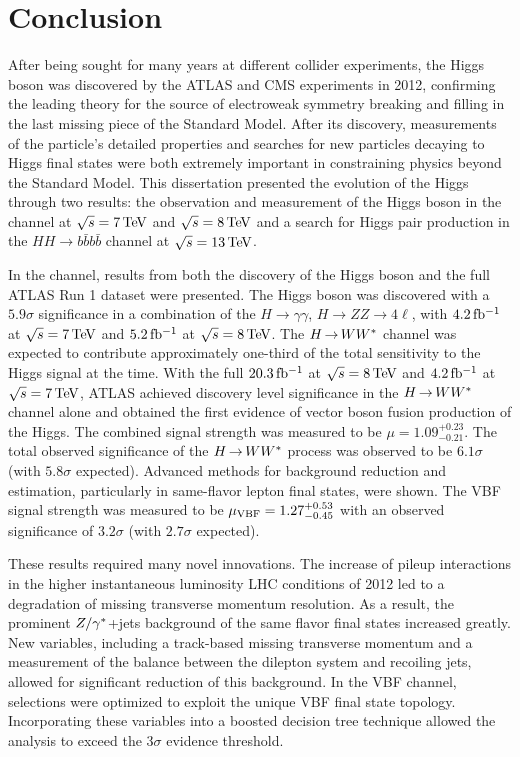 \chapter{Conclusion}
\label{conclusion}

After being sought for many years at different collider experiments, the Higgs boson was discovered by the ATLAS and CMS experiments in 2012, confirming the leading theory for the source of electroweak symmetry breaking and filling in the last missing piece of the Standard Model. After its discovery, measurements of the particle's detailed properties and searches for new particles decaying to Higgs final states were both extremely important in constraining physics beyond the Standard Model. This dissertation presented the evolution of the Higgs through two results: the observation and measurement of the Higgs boson in the \HWWfull channel at $\sqrt{s} = 7 \TeV$ and $\sqrt{s} = 8 \TeV$ and a search for Higgs pair production in the $HH\to b\bar{b}b\bar{b}$ channel at $\sqrt{s} = 13 \TeV$.

In the \HWWfull channel, results from both the discovery of the Higgs boson and the full ATLAS Run 1 dataset were presented. The Higgs boson was discovered with a $5.9\sigma$ significance in a combination of the $H\to\gamma\gamma$, $H\to ZZ \to 4\ell$, \HWWfull with $4.2\mbox{\,fb$^{-1}$}$ at $\sqrt{s} = 7 \TeV$ and $5.2\mbox{\,fb$^{-1}$}$ at $\sqrt{s} = 8 \TeV$. The $H{\,{\rightarrow}\,}WW^\ast$ channel was expected to contribute approximately one-third of the total sensitivity to the Higgs signal at the time. With the full $20.3\mbox{\,fb$^{-1}$}$ at $\sqrt{s} =  8 \TeV$ and $4.2\mbox{\,fb$^{-1}$}$ at $\sqrt{s} = 7 \TeV$, ATLAS achieved discovery level significance in the $H{\,{\rightarrow}\,}WW^\ast$ channel alone and obtained the first evidence of vector boson fusion production of the Higgs. The combined signal strength was measured to be $\mu = 1.09^{+0.23}_{-0.21}$. The total observed significance of the $H{\,{\rightarrow}\,}WW^\ast$ process was observed to be $6.1\sigma$ (with $5.8 \sigma$ expected). Advanced methods for background reduction and estimation, particularly in same-flavor lepton final states, were shown. The VBF signal strength was measured to be $\mu_{\rm VBF} = 1.27^{+0.53}_{-0.45}$ with an observed significance of $3.2\sigma$ (with $2.7 \sigma$ expected). 

These results required many novel innovations. The increase of pileup interactions in the higher instantaneous luminosity LHC conditions of 2012 led to a degradation of missing transverse momentum resolution. As a result, the prominent $Z/\gamma^{\ast}$+jets background of the same flavor \HWWfull final states increased greatly. New variables, including a track-based missing transverse momentum and a measurement of the balance between the dilepton system and recoiling jets, allowed for significant reduction of this background. In the VBF channel, selections were optimized to exploit the unique VBF final state topology. Incorporating these variables into a boosted decision tree technique allowed the analysis to exceed the $3\sigma$ evidence threshold.

